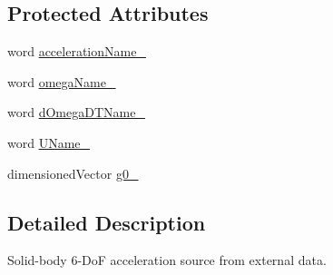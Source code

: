 \subsection*{Protected Attributes}
\begin{DoxyCompactItemize}
\item 
word \hyperlink{classFoam_1_1fv_1_1coupledAccelerationSource_ac6ed1b6034e0d4c6c85cb7f131cca30c}{acceleration\+Name\+\_\+}
\item 
word \hyperlink{classFoam_1_1fv_1_1coupledAccelerationSource_aecc5f3574a7b55ec42a203620cd68ef3}{omega\+Name\+\_\+}
\item 
word \hyperlink{classFoam_1_1fv_1_1coupledAccelerationSource_a11cd1a167561974e025932276918132c}{d\+Omega\+D\+T\+Name\+\_\+}
\item 
word \hyperlink{classFoam_1_1fv_1_1coupledAccelerationSource_a26baeb8965b38a0f4d68f1ce68b39500}{U\+Name\+\_\+}
\item 
dimensioned\+Vector \hyperlink{classFoam_1_1fv_1_1coupledAccelerationSource_a565d2d50f78b2025f20ec1f4dec1d93b}{g0\+\_\+}
\end{DoxyCompactItemize}


\subsection{Detailed Description}
Solid-\/body 6-\/\+DoF acceleration source from external data. 

